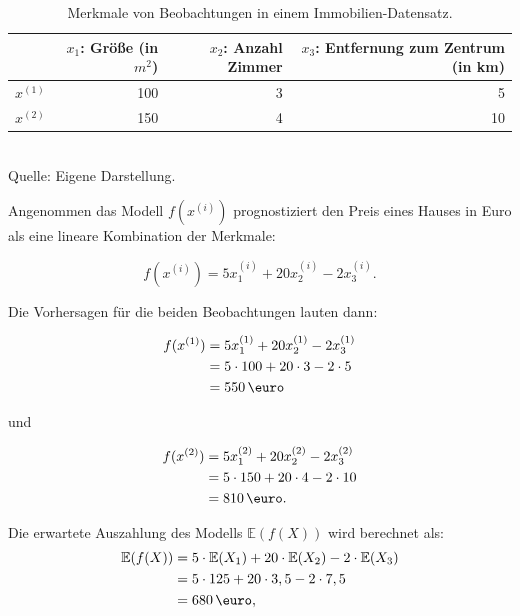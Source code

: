 \begin{table}[!h]
    \caption{Merkmale von Beobachtungen in einem Immobilien-Datensatz.}
    \footnotesize
    \begin{tabularx}{\textwidth}{Xrrr}
    \toprule
     & $x_1$: Größe (in $m^2$) &  $x_2$: Anzahl Zimmer &  $x_3$: Entfernung zum Zentrum (in km) \\
    \midrule
    $x^{(1)}$ & 100 & 3 & 5 \\
    $x^{(2)}$ & 150 & 4 & 10 \\
    \bottomrule
    \end{tabularx}
    \label{tab:example}
    \normalsize\\
    Quelle: Eigene Darstellung.
\end{table}

Angenommen das Modell $f(x^{(i)})$ prognostiziert den Preis eines Hauses in Euro als eine lineare Kombination der Merkmale:

\begin{equation}
    f(x^{(i)}) = 5x_1^{(i)} + 20x_2^{(i)} - 2x_3^{(i)}.
\end{equation}

Die Vorhersagen für die beiden Beobachtungen lauten dann:

\begin{align}
    \label{eq:fx1}
    f(x^{(1)}) &= 5x_1^{(1)} + 20x_2^{(1)} - 2x_3^{(1)} \\ \notag
        &= 5 \cdot 100 + 20 \cdot 3 - 2 \cdot 5 \\ \notag
        &= 550\,\text{\euro} 
\end{align}

und 

\begin{align}
    f(x^{(2)}) &= 5x_1^{(2)} + 20x_2^{(2)} - 2x_3^{(2)} \\ \notag
        &= 5 \cdot 150 + 20 \cdot 4 - 2 \cdot 10 \\ \notag
        &= 810\,\text{\euro}. 
\end{align}

Die erwartete Auszahlung des Modells $\mathbb{E}(f(X))$ wird berechnet als:
\begin{align}
    \label{eq:efx}
    \mathbb{E}(f(X)) &= 5 \cdot \mathbb{E}(X_1) + 20 \cdot \mathbb{E}(X_2) - 2 \cdot \mathbb{E}(X_3) \\ \notag
                     &= 5 \cdot 125 + 20 \cdot 3,5 - 2 \cdot 7,5 \\ \notag
                     &= 680 \,\text{\euro},
\end{align}

